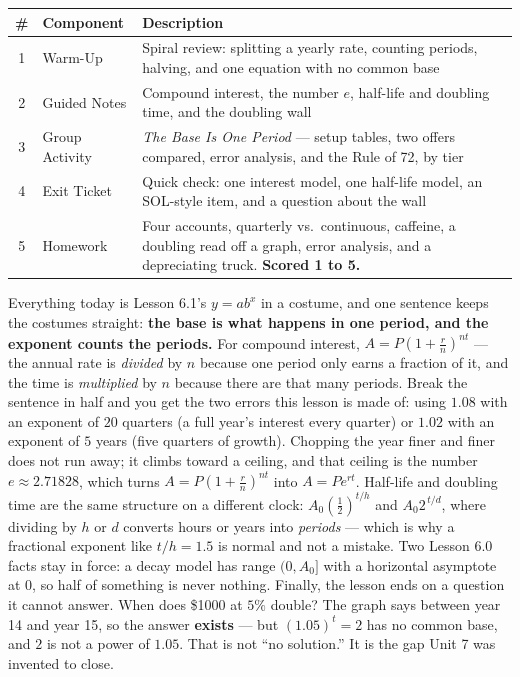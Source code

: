 \documentclass[10pt]{article}
\begin{document}
\begin{tocbox}
\small
\renewcommand{\arraystretch}{1.5}
\begin{tabularx}{\linewidth}{@{} c l X @{}}
\rowcolor{forestbg}
\textbf{\#} & \textbf{Component} & \textbf{Description} \\
\midrule
1 & Warm-Up        & Spiral review: splitting a yearly rate, counting periods, halving, and one equation with no common base \\
2 & Guided Notes   & Compound interest, the number $e$, half-life and doubling time, and the doubling wall \\
3 & Group Activity & \emph{The Base Is One Period} --- setup tables, two offers compared, error analysis, and the Rule of 72, by tier \\
4 & Exit Ticket    & Quick check: one interest model, one half-life model, an SOL-style item, and a question about the wall \\
5 & Homework       & Four accounts, quarterly vs.\ continuous, caffeine, a doubling read off a graph, error analysis, and a depreciating truck. \textbf{Scored 1 to 5.} \\
\end{tabularx}
\end{tocbox}

\vspace{0.10in}

\begin{remindbox}
\small Everything today is Lesson 6.1's $y=ab^{x}$ in a costume, and one sentence keeps the costumes
straight: \textbf{the base is what happens in one period, and the exponent counts the periods.} For
compound interest, $A=P\left(1+\frac{r}{n}\right)^{nt}$ --- the annual rate is \emph{divided} by $n$
because one period only earns a fraction of it, and the time is \emph{multiplied} by $n$ because there
are that many periods. Break the sentence in half and you get the two errors this lesson is made of:
using $1.08$ with an exponent of $20$ quarters (a full year's interest every quarter) or $1.02$ with an
exponent of $5$ years (five quarters of growth). Chopping the year finer and finer does not run away;
it climbs toward a ceiling, and that ceiling is the number \textbf{$e\approx2.71828$}, which turns
$A=P\left(1+\frac{r}{n}\right)^{nt}$ into $A=Pe^{rt}$. Half-life and doubling time are the same
structure on a different clock: $A_{0}\left(\frac12\right)^{t/h}$ and $A_{0}2^{\,t/d}$, where dividing
by $h$ or $d$ converts hours or years into \emph{periods} --- which is why a fractional exponent like
$t/h=1.5$ is normal and not a mistake. Two Lesson 6.0 facts stay in force: a decay model has range
$(0,A_{0}]$ with a horizontal asymptote at $0$, so half of something is never nothing. Finally, the
lesson ends on a question it cannot answer. When does \$1000 at $5\%$ double? The graph says between
year 14 and year 15, so the answer \textbf{exists} --- but $(1.05)^{t}=2$ has no common base, and $2$
is not a power of $1.05$. That is not ``no solution.'' It is the gap Unit 7 was invented to close.
\end{remindbox}
\end{document}
